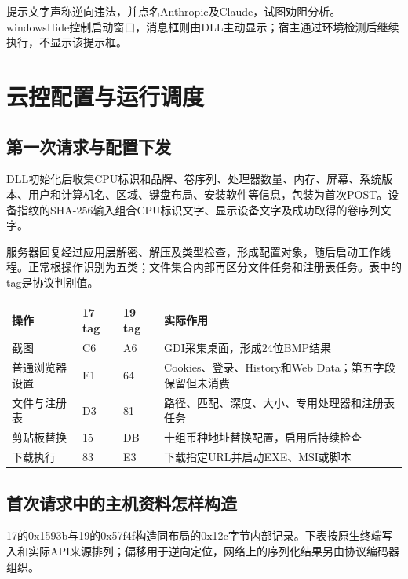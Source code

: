 \documentclass[UTF8,a4paper,zihao=5,fontset=windows]{ctexart}
\newcommand{\code}[1]{{\ttfamily\small #1}}
\begin{document}
提示文字声称逆向违法，并点名Anthropic及Claude，试图劝阻分析。\code{windowsHide}控制启动窗口，消息框则由DLL主动显示；宿主通过环境检测后继续执行，不显示该提示框。

\section{云控配置与运行调度}
\label{sec:control}
\subsection{第一次请求与配置下发}
DLL初始化后收集CPU标识和品牌、卷序列、处理器数量、内存、屏幕、系统版本、用户和计算机名、区域、键盘布局、安装软件等信息，包装为首次POST。设备指纹的SHA-256输入组合CPU标识文字、显示设备文字及成功取得的卷序列文字。

服务器回复经过应用层解密、解压及类型检查，形成配置对象，随后启动工作线程。正常根操作识别为五类；文件集合内部再区分文件任务和注册表任务。表中的tag是协议判别值。
\begingroup\small
\begin{longtable}{@{}L{29mm} L{15mm} L{15mm} L{91mm}@{}}
\toprule 操作 & 17 tag & 19 tag & 实际作用 \\
\midrule\endhead
截图 & \code{C6} & \code{A6} & GDI采集桌面，形成24位BMP结果 \\
普通浏览器设置 & \code{E1} & \code{64} & Cookies、登录、History和Web Data；第五字段保留但未消费 \\
文件与注册表 & \code{D3} & \code{81} & 路径、匹配、深度、大小、专用处理器和注册表任务 \\
剪贴板替换 & \code{15} & \code{DB} & 十组币种地址替换配置，启用后持续检查 \\
下载执行 & \code{83} & \code{E3} & 下载指定URL并启动EXE、MSI或脚本 \\
\bottomrule\end{longtable}\endgroup


\subsection{首次请求中的主机资料怎样构造}
17的\code{0x1593b}与19的\code{0x57f4f}构造同布局的\code{0x12c}字节内部记录。下表按原生终端写入和实际API来源排列；偏移用于逆向定位，网络上的序列化结果另由协议编码器组织。
\end{document}
